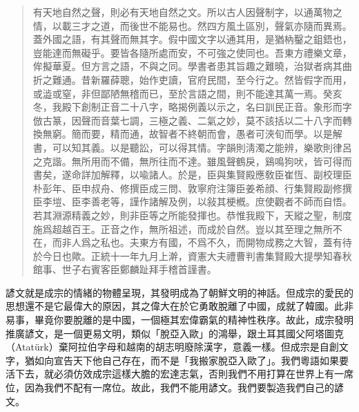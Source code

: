 \documentclass[a5paper, 12pt, openany]{book} %
\begin{document}
\begin{quotation}
  有天地自然之聲，則必有天地自然之文。所以古人因聲制字，以通萬物之情，以載三才之道，而後世不能易也。然四方風土區別，聲氣亦隨而異焉。蓋外國之語，有其聲而無其字。假中國文字以通其用，是猶枘鑿之鉏鋙也，豈能達而無礙乎。要皆各隨所處而安，不可強之使同也。吾東方禮樂文章，侔擬華夏。但方言之語，不與之同。學書者患其旨趣之難曉，治獄者病其曲折之難通。昔新羅薛聰，始作吏讀，官府民間，至今行之。然皆假字而用，或澁或窒，非但鄙陋無稽而已，至於言語之間，則不能達其萬一焉。癸亥冬，我殿下創制正音二十八字，略揭例義以示之，名曰訓民正音。象形而字倣古篆，因聲而音葉七調，三極之義、二氣之妙，莫不該括以二十八字而轉換無窮。簡而要，精而通，故智者不終朝而會，愚者可浹旬而學。以是解書，可以知其義。以是聽訟，可以得其情。字韻則淸濁之能辨，樂歌則律呂之克諧。無所用而不備，無所往而不達。雖風聲鶴戾，鷄鳴狗吠，皆可得而書矣，遂命詳加解釋，以喩諸人。於是，臣與集賢殿應敎臣崔恆、副校理臣朴彭年、臣申叔舟、修撰臣成三問、敦寧府注簿臣姜希顔、行集賢殿副修撰臣李塏、臣李善老等，謹作諸解及例，以敍其梗槪。庶使觀者不師而自悟。若其淵源精義之妙，則非臣等之所能發揮也。恭惟我殿下，天縱之聖，制度施爲超越百王。正音之作，無所祖述，而成於自然。豈以其至理之無所不在，而非人爲之私也。夫東方有國，不爲不久，而開物成務之大智，蓋有待於今日也歟。正統十一年九月上澣，資憲大夫禮曹判書集賢殿大提學知春秋館事、世子右賓客臣鄭麟趾拜手稽首謹書。  
\end{quotation}

諺文就是成宗的情緒的物體呈現，其發明成為了朝鮮文明的神話。但成宗的愛民的思想還不是它最偉大的原因，其之偉大在於它勇敢脫離了中國，成就了韓國。此非易事，畢竟你要脫離的是中國，一個極其宏偉霸氣的精神性秩序。故此，成宗發明推廣諺文，是一個更易文明，類似「脫亞入歐」的鴻舉，跟土耳其國父阿塔圖克（Atatürk）棄阿拉伯字母和越南的胡志明廢除漢字，意義一樣。但成宗是自創文字，猶如向宣告天下他自己存在，而不是「我搬家脫亞入歐了」。我們粵語如果要活下去，就必須仿效成宗這樣大膽的宏達志氣，否則我們不用打算在世界上有一席位，因為我們不配有一席位。故此，我們不能用諺文。我們要製造我們自己的諺文。
\end{document}
